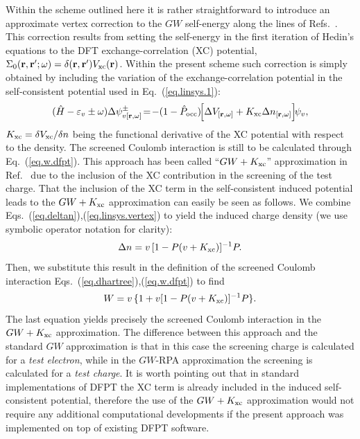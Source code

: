 \documentclass[twocolumn,prb,showpacs,superscriptaddress]{revtex4}
\def\w{\omega}
\def\H{\hat{H}}
\def\P{\hat{P}_{\rm occ}}
\def\E{\varepsilon}
\def\r{{\bf r}}
\def\rp{{\bf r^\prime}}
\begin{document}
Within the scheme outlined here it is rather straightforward to introduce
an approximate vertex correction to the $GW$ self-energy along the lines 
of Refs.\ . This correction results from setting
the self-energy in the first iteration of Hedin's equations to the DFT
exchange-correlation (XC) potential, $\Sigma_0(\r,\rp;\w) = \delta(\r,\rp) V_{\rm xc}(\r)$.
Within the present scheme such correction is simply obtained by including
the variation of the exchange-correlation
potential in the self-consistent potential used in Eq.\ (\ref{eq.linsys.1}):
  \begin{equation}\label{eq.linsys.vertex}
  (\H-\E_v\pm\w) \Delta \psi^\pm_{v[\r,\w]}\!  = \!-(1-\P)\!  \Big[\Delta V_{[\r,\w]} + K_{\rm xc}\Delta n_{[\r,\w]}\Big] \! \psi_v,
  \end{equation}
$K_{\rm xc}=\delta V_{\rm xc}/\delta n$ being the functional derivative of the XC
potential with respect to the density. The screened Coulomb interaction is still
to be calculated through Eq.\ (\ref{eq.w.dfpt}). This approach has been called 
``$GW+K_{\rm xc}$'' approximation in Ref.\  due to the inclusion of the XC contribution
in the screening of the test charge. 
That the inclusion of the XC term in the self-consistent
induced potential leads to the $GW+K_{\rm xc}$ approximation can easily be seen as follows.
We combine Eqs.\ (\ref{eq.deltan}),(\ref{eq.linsys.vertex}) to yield
the induced charge density (we use symbolic operator notation for clarity):
 \begin{equation}
 \Delta n = v\,[1- P (v+K_{\rm xc})]^{-1}P .
 \end{equation}
Then, we substitute this result in the definition of the screened Coulomb interaction
Eqs.\ (\ref{eq.dhartree}),(\ref{eq.w.dfpt}) to find
 \begin{equation}
 W = v \,\{ 1 + v [1-P(v+K_{\rm xc})]^{-1}P \}.
 \end{equation}
The last equation yields precisely the screened Coulomb interaction in the $GW+K_{\rm xc}$ approximation.\cite{hl86,reining94}
The difference between this approach and the
standard $GW$ approximation is that in this case the screening
charge is calculated for a {\it test electron}, while in the $GW$-RPA approximation
the screening is calculated for a {\it test charge}.
It is worth pointing out that in standard implementations of DFPT the
XC term is already included in the induced self-consistent potential,\cite{baroni.rmp}
therefore the use of the $GW+K_{\rm xc}$ approximation would not require any additional
computational developments if the 
present approach was implemented on top of existing DFPT software.\cite{espresso}
\end{document}
